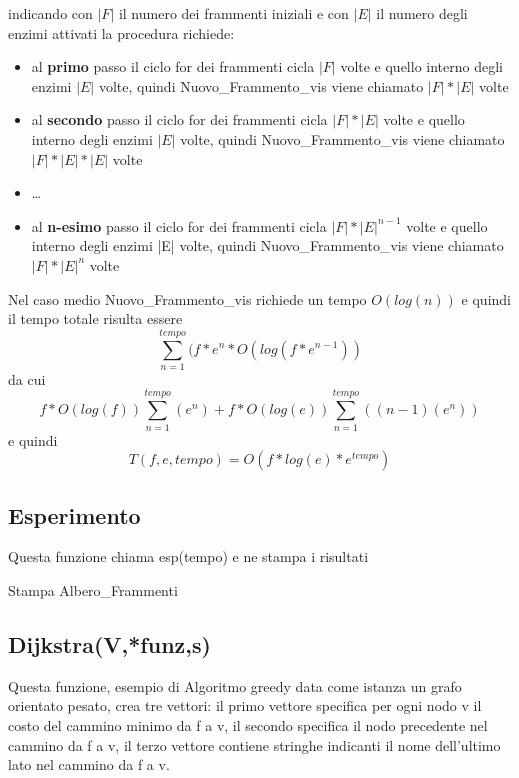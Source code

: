 \documentclass[a4paper,10pt]{article}
\newcommand{\grass}[1]{\textbf{#1}}
\begin{document}
indicando con $|F|$ il numero dei frammenti iniziali e con $|E|$ il numero degli enzimi attivati la procedura richiede:
\begin{itemize}
\item al \grass{primo} passo il ciclo for dei frammenti cicla $|F|$ volte e quello interno degli enzimi $|E|$ volte, quindi Nuovo\_{}Frammento\_{}vis viene chiamato $|F|*|E|$ volte
\item al \grass{secondo} passo il ciclo for dei frammenti cicla $|F|*|E|$ volte e quello interno degli enzimi $|E|$ volte, quindi Nuovo\_{}Frammento\_{}vis viene chiamato $|F|*|E|*|E|$ volte
\item \dots
\item al \grass{n-esimo} passo il ciclo for dei frammenti cicla $|F|*|E|^{n-1}$ volte e quello interno degli enzimi |E| volte, quindi Nuovo\_{}Frammento\_{}vis viene chiamato $|F|*|E|^n$ volte
\end{itemize}
Nel caso medio Nuovo\_{}Frammento\_{}vis richiede un tempo $O(log(n))$ e quindi il tempo totale risulta essere \begin{displaymath}\sum_{n=1}^{tempo}{(f*e^n*O(log(f*e^{n-1}))}
\end{displaymath}
da cui \begin{displaymath}
f*O(log(f))\sum_{n=1}^{tempo}{(e^n)} + f*O(log(e))\sum_{n=1}^{tempo}{((n-1)(e^n))}
\end{displaymath}
e quindi \begin{displaymath}
T(f,e,tempo) = O(f*log(e)*e^{tempo})
\end{displaymath}

\subsection{Esperimento}
Questa funzione chiama esp(tempo) e ne stampa i risultati

\begin{algorithm}[H]
Stampa Albero\_{}Frammenti\;
\end{algorithm}
\subsection{Dijkstra(V,*funz,s)}
Questa funzione, esempio di Algoritmo greedy data come istanza un grafo orientato pesato, crea tre vettori: il primo vettore specifica per ogni nodo v il costo del cammino minimo da f a v, il secondo specifica il nodo precedente nel cammino da f a v, il terzo vettore contiene stringhe indicanti il nome dell'ultimo lato nel cammino da f a v.
\end{document}

